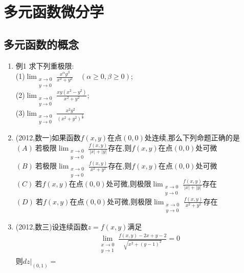 \documentclass[12pt, a4paper, oneside, UTF8]{ctexbook}
\begin{document}

\else
\fi

\chapter{多元函数微分学}
\section{多元函数的概念}

\begin{enumerate}[label=\arabic*.]
    \item 例1 求下列重极限: \\
        (1)$\displaystyle \lim_{\substack{x\to 0\\ y\to 0}}\frac{x^\alpha y^\beta}{x^2+y^2}\quad (\alpha\geq0,\beta\geq0)$; \\
        (2)$\displaystyle \lim_{\substack{x\to 0\\ y\to 0}}\frac{xy(x^{2}-y^{2})}{x^{2}+y^{2}}$; \\
        (3)$\displaystyle \lim_{\substack{x\to 0\\ y\to 0}}\frac{x^2y^2}{(x^2+y^2)^{\frac{3}{2}}}$
    
    \begin{solution}
    \newpage
    \end{solution}
    
    \item (2012,数一)如果函数$f(x,y)$在点$(0,0)$处连续,那么下列命题正确的是 \\
    $\displaystyle (A)\ \text{若极限}\lim_{\substack{x\to 0\\ y\to 0}}\frac{f(x,y)}{|x|+|y|}\text{存在,则}f(x,y)\text{在点}(0,0)\text{处可微}$ \\
    $\displaystyle (B)\ \text{若极限}\lim_{\substack{x\to 0\\ y\to 0}}\frac{f(x,y)}{x^{2}+y^{2}}\text{存在,则}f(x,y)\text{在点}(0,0)\text{处可微}$ \\
    $\displaystyle (C)\ \text{若}f(x,y)\text{在点}(0,0)\text{处可微,则极限}\lim_{\substack{x\to 0\\ y\to 0}}\frac{f(x,y)}{|x|+|y|}\text{存在}$ \\
    $\displaystyle (D)\ \text{若}f(x,y)\text{在点}(0,0)\text{处可微,则极限}\lim_{\substack{x\to 0\\ y\to 0}}\frac{f(x,y)}{x^{2}+y^{2}}\text{存在}$
    
    \begin{solution}
    \newpage
    \end{solution}
    
    \item (2012,数三)设连续函数$z=f(x,y)$满足
    \begin{align*}
        \lim_{\substack{x\to 0\\ y\to 1}}\frac{f(x,y)-2x+y-2}{\sqrt{x^2+(y-1)^2}}=0
    \end{align*}
    则$\left.dz\right|_{(0,1)}=$
    
    \begin{solution}
    \newpage
    \end{solution}
\end{enumerate}
\end{document}

